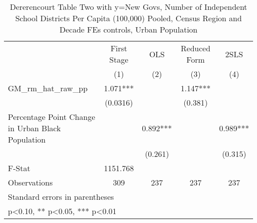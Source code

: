 \begin{table}[htbp]\centering
\def\sym#1{\ifmmode^{#1}\else\(^{#1}\)\fi}
\caption{Dererencourt Table Two with y=New Govs, Number of Independent School Districts Per Capita (100,000) Pooled, Census Region and Decade FEs controls, Urban Population}
\begin{tabular}{l*{4}{c}}
\toprule
                    & First Stage   &         OLS   &Reduced Form   &        2SLS   \\
                    &\multicolumn{1}{c}{(1)}   &\multicolumn{1}{c}{(2)}   &\multicolumn{1}{c}{(3)}   &\multicolumn{1}{c}{(4)}   \\
\midrule
GM\_rm\_hat\_raw\_pp    &       1.071***&               &       1.147***&               \\
                    &    (0.0316)   &               &     (0.381)   &               \\
\addlinespace
Percentage Point Change in Urban Black Population&               &       0.892***&               &       0.989***\\
                    &               &     (0.261)   &               &     (0.315)   \\
\midrule
F-Stat              &    1151.768   &               &               &               \\
Observations        &         309   &         237   &         237   &         237   \\
\bottomrule
\multicolumn{5}{l}{\footnotesize Standard errors in parentheses}\\
\multicolumn{5}{l}{\footnotesize * p<0.10, ** p<0.05, *** p<0.01}\\
\end{tabular}
\end{table}
